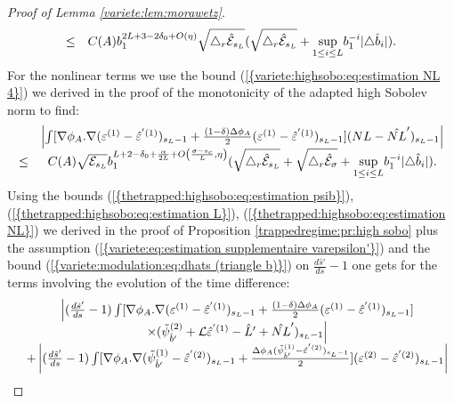 \documentclass[11pt,a4paper,reqno]{amsart}
\theoremstyle{remark}
\numberwithin{equation}{section}
\begin{document}
\begin{proof}[Proof of Lemma \ref{variete:lem:morawetz}]
\begin{equation}
\begin{array}{r c l}
\leq& C(A)b_1^{2L+3-2\delta_0+O(\eta)}\sqrt{\triangle _r \hat{\mathcal{E}}_{s_L}} (\sqrt{\triangle _r\hat{\mathcal{E}}_{s_L}}+ \underset{1\leq i \leq L}{\text{sup}}b_1^{-i}|\triangle \hat{b}_i|) .
\end{array}
\end{equation}
For the nonlinear terms we use the bound {{\rm (\ref{{variete:highsobo:eq:estimation NL 4}})}} we derived in the proof of the monotonicity of the adapted high Sobolev norm to find:
\begin{equation} \label{variete:morawetz:eq:estimation NL}
\begin{array}{r c l}
&\left|\int [\nabla \phi_A .\nabla(\varepsilon^{(1)}-\hat{\varepsilon}^{'(1)})_{s_L-1}+\frac{(1-\delta)\Delta \phi_A}{2}(\varepsilon^{(1)}-\hat{\varepsilon}^{'(1)})_{s_L-1}](NL-\hat{NL}')_{s_L-1}\right|\\
\leq & C(A)\sqrt{\mathcal{E}_{s_L}}b_1^{L+2-\delta_0+\frac{\alpha}{2L}+O\left( \frac{\sigma-s_c}{L},\eta\right)}(\sqrt{\triangle_r \hat{\mathcal{E}}_{s_L}}+\sqrt{\triangle_r \hat{\mathcal{E}}_{\sigma}}+\underset{1\leq i \leq L}{\text{sup}}b_1^{-i}|\triangle \hat{b}_i|).
\end{array}
\end{equation}
Using the bounds {{\rm (\ref{{thetrapped:highsobo:eq:estimation psib}})}}, {{\rm (\ref{{thetrapped:highsobo:eq:estimation L}})}}, {{\rm (\ref{{thetrapped:highsobo:eq:estimation NL}})}} we derived in the proof of Proposition \ref{trappedregime:pr:high sobo} plus the assumption {{\rm (\ref{{variete:eq:estimation supplementaire varepsilon'}})}} and the bound {{\rm (\ref{{variete:modulation:eq:dhats (triangle b)}})}} on $\frac{d\hat{s}'}{ds}-1$ one gets for the terms involving the evolution of the time difference:
\begin{equation} \label{variete:morawetz:eq:estimation dhats'-1}
\begin{array}{r c l}
&\Bigl{|}(\frac{d\hat{s}'}{ds}-1)\int [\nabla \phi_A .\nabla(\varepsilon^{(1)}-\hat{\varepsilon}^{'(1)})_{s_L-1}+\frac{(1-\delta)\Delta \phi_A}{2}(\varepsilon^{(1)}-\hat{\varepsilon}^{'(1)})_{s_L-1}]\\
&\times(\tilde{\psi}_{\hat{b}'}^{(2)}+\mathcal{L}\hat{\varepsilon}^{'(1)}-\hat{L}'+\hat{NL}')_{s_L-1}\Bigr{|}\\
&+\left|(\frac{d\hat{s}'}{ds}-1)\int [\nabla \phi_A .\nabla(\tilde{\psi}_{\hat{b}'}^{(1)}-\hat{\varepsilon}^{'(2)})_{s_L-1}+\frac{\Delta \phi_A(\tilde{\psi}_{\hat{b}'}^{(1)}-\hat{\varepsilon}^{'(2)})_{s_L-1}}{2}](\varepsilon^{(2)}-\hat{\varepsilon}^{'(2)})_{s_L-1}\right|\\

\end{array}
\end{equation}
\end{proof}
\end{document}
